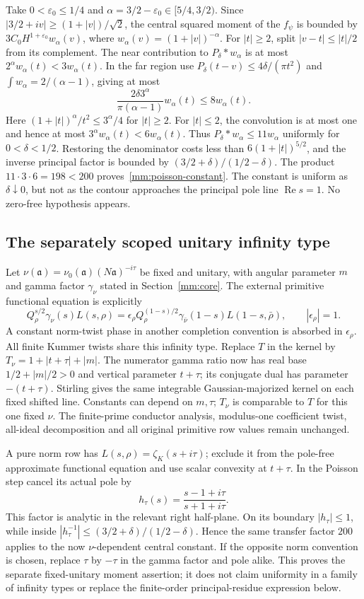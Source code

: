 \documentclass[11pt,oneside,openany]{book}
\theoremstyle{definition}\newtheorem{definition}[theorem]{Definition}
\theoremstyle{remark}\newtheorem{remark}[theorem]{Remark}
\begin{document}
Take $0<\varepsilon_0\le1/4$ and
$\alpha=3/2-\varepsilon_0\in[5/4,3/2)$. Since
$|3/2+iv|\ge(1+|v|)/\sqrt2$, the central squared moment of the
$f_\psi$ is bounded by
$3C_0H^{1+\varepsilon_0}w_\alpha(v)$, where
$w_\alpha(v)=(1+|v|)^{-\alpha}$.
For $|t|\ge2$, split $|v-t|\le|t|/2$ from its complement. The
near contribution to $P_\delta*w_\alpha$ is at most
$2^\alpha w_\alpha(t)<3w_\alpha(t)$. In the far region use
$P_\delta(t-v)\le4\delta/(\pi t^2)$ and
$\int w_\alpha=2/(\alpha-1)$, giving at most
\[
 \frac{2\delta3^\alpha}{\pi(\alpha-1)}w_\alpha(t)
 \le8w_\alpha(t).
\]
Here $(1+|t|)^\alpha/t^2\le3^\alpha/4$ for $|t|\ge2$.
For $|t|\le2$, the convolution is at most one and hence at most
$3^\alpha w_\alpha(t)<6w_\alpha(t)$. Thus
$P_\delta*w_\alpha\le11w_\alpha$ uniformly for $0<\delta<1/2$.
Restoring the denominator costs less than
$6(1+|t|)^{5/2}$, and the inverse principal factor is bounded by
$(3/2+\delta)/(1/2-\delta)$. The product $11\cdot3\cdot6=198<200$
proves~\eqref{mm:poisson-constant}. The constant is uniform as
$\delta\downarrow0$, but not as the contour approaches the principal
pole line $\operatorname{Re}s=1$. No zero-free hypothesis appears.

\subsection{The separately scoped unitary infinity type}
Let $\nu(\mathfrak a)=\nu_0(\mathfrak a)(N\mathfrak a)^{-i\tau}$
be fixed and unitary, with angular parameter $m$ and gamma factor
$\gamma_\nu$ stated in Section~\ref{mm:core}. The external primitive
functional equation is explicitly
\[
 Q_\rho^{s/2}\gamma_\nu(s)L(s,\rho)
 =\epsilon_\rho Q_\rho^{(1-s)/2}
                 \gamma_{\bar\nu}(1-s)L(1-s,\bar\rho),
 \qquad |\epsilon_\rho|=1.
\]
A constant norm-twist phase in another completion convention is absorbed
in $\epsilon_\rho$. All finite Kummer twists share this infinity type.
Replace $T$ in the kernel by $T_\nu=1+|t+\tau|+|m|$.
The numerator gamma ratio now has real base $1/2+|m|/2>0$ and
vertical parameter $t+\tau$; its conjugate dual has parameter
$-(t+\tau)$. Stirling gives the same integrable Gaussian-majorized
kernel on each fixed shifted line. Constants can depend on $m,\tau$;
$T_\nu$ is comparable to $T$ for this one fixed $\nu$.
The finite-prime conductor analysis, modulus-one coefficient twist,
all-ideal decomposition and all original primitive row values remain
unchanged.

A pure norm row has $L(s,\rho)=\zeta_K(s+i\tau)$; exclude it from
the pole-free approximate functional equation and use scalar convexity
at $t+\tau$. In the Poisson step cancel its actual pole by
\[
 h_\tau(s)=\frac{s-1+i\tau}{s+1+i\tau}.
\]
This factor is analytic in the relevant right half-plane. On its
boundary $|h_\tau|\le1$, while inside
$|h_\tau^{-1}|\le(3/2+\delta)/(1/2-\delta)$.
Hence the same transfer factor $200$ applies to the now
$\nu$-dependent central constant. If the opposite norm convention is
chosen, replace $\tau$ by $-\tau$ in the gamma factor and pole alike.
This proves the separate fixed-unitary moment assertion; it does not
claim uniformity in a family of infinity types or replace the
finite-order principal-residue expression below.
\end{document}
